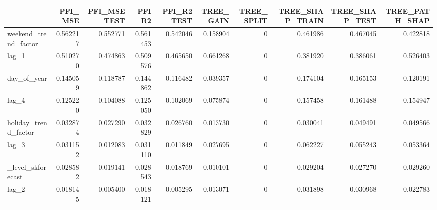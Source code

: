 \begin{tabular}{lrrrrrrrrr}
\toprule
 & PFI_MSE & PFI_MSE_TEST & PFI_R2 & PFI_R2_TEST & TREE_GAIN & TREE_SPLIT & TREE_SHAP_TRAIN & TREE_SHAP_TEST & TREE_PATH_SHAP \\
\midrule
weekend_trend_factor & 0.562217 & 0.552771 & 0.561453 & 0.542046 & 0.158904 & 0 & 0.461986 & 0.467045 & 0.422818 \\
lag_1 & 0.510270 & 0.474863 & 0.509576 & 0.465650 & 0.661268 & 0 & 0.381920 & 0.386061 & 0.526403 \\
day_of_year & 0.145059 & 0.118787 & 0.144862 & 0.116482 & 0.039357 & 0 & 0.174104 & 0.165153 & 0.120191 \\
lag_4 & 0.125220 & 0.104088 & 0.125050 & 0.102069 & 0.075874 & 0 & 0.157458 & 0.161488 & 0.154947 \\
holiday_trend_factor & 0.032874 & 0.027290 & 0.032829 & 0.026760 & 0.013730 & 0 & 0.030041 & 0.049491 & 0.049566 \\
lag_3 & 0.031152 & 0.012083 & 0.031110 & 0.011849 & 0.027695 & 0 & 0.062227 & 0.055243 & 0.053364 \\
_level_skforecast & 0.028582 & 0.019141 & 0.028543 & 0.018769 & 0.010101 & 0 & 0.029204 & 0.027270 & 0.029260 \\
lag_2 & 0.018145 & 0.005400 & 0.018121 & 0.005295 & 0.013071 & 0 & 0.031898 & 0.030968 & 0.022783 \\
\bottomrule
\end{tabular}
